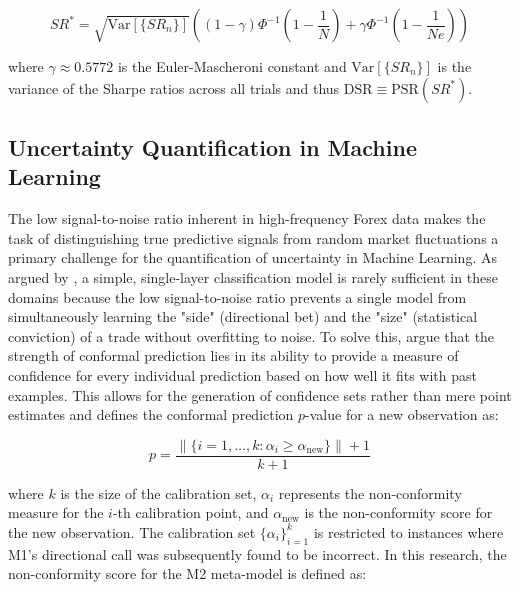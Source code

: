 \documentclass[12pt, a4paper]{article}
\begin{document}
\begin{equation}
SR^* = \sqrt{\text{Var}[\{SR_n\}]} \left( (1-\gamma) \Phi^{-1}\left(1 - \frac{1}{N}\right) + \gamma \Phi^{-1}\left(1 - \frac{1}{Ne}\right) \right)
\label{eq:sr_star}
\end{equation}

where \(\gamma \approx 0.5772\) is the Euler-Mascheroni constant and \(\text{Var}[\{SR_n\}]\) is the variance of the Sharpe ratios across all trials and 
thus \( \text{DSR} \equiv \text{PSR}(SR^*) \). 


\subsection{Uncertainty Quantification in Machine Learning}\label{sec:conformal_preds}

The low signal-to-noise ratio inherent in high-frequency Forex data makes the task of distinguishing true predictive signals 
from random market fluctuations a primary challenge for the quantification of uncertainty in Machine Learning.
As argued by \textcite{lopez_de_prado_advances_2018}, a simple, single-layer classification model is rarely sufficient in these domains 
because the low signal-to-noise ratio prevents a single model from simultaneously learning the "side" (directional bet) and 
the "size" (statistical conviction) of a trade without overfitting to noise. 
To solve this, \textcite{shafer_tutorial_2008} argue that the strength of conformal prediction lies in its ability to provide a measure of
confidence for every individual prediction based on how well it fits with past examples. 
This allows for the generation of confidence sets rather than mere point estimates and defines the conformal prediction \( p \)-value for a new
observation as:

\begin{equation}
p = \frac{\left\|\{i = 1, \ldots, k : \alpha_i \geq \alpha_{\text{new}}\}\right\| + 1}{k + 1}
\label{eq:conformal_p}
\end{equation}

where \( k \) is the size of the calibration set, \( \alpha_i \) represents the non-conformity measure for the 
\( i \)-th calibration point, and \( \alpha_{\text{new}} \) is the non-conformity score for the new observation. 
The calibration set \( \{\alpha_i\}_{i=1}^{k} \) is restricted to instances where M1's directional call was 
subsequently found to be incorrect. In this research, the non-conformity score for the M2 meta-model is defined as:
\end{document}
